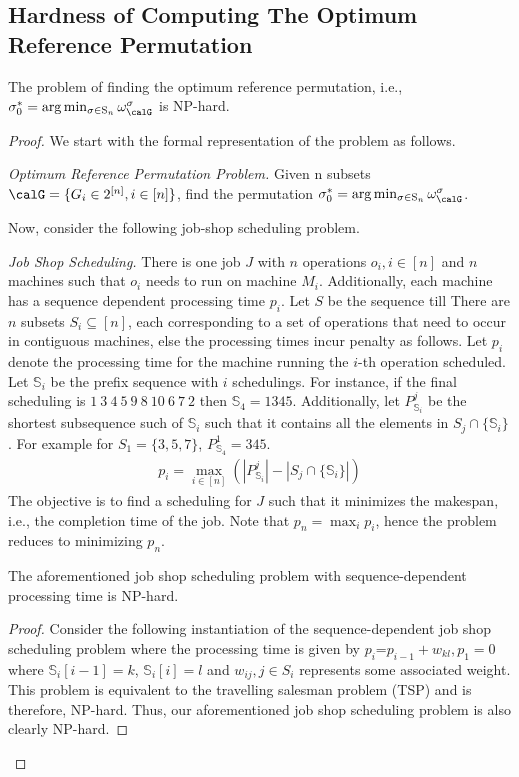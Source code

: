 \subsection{Hardness of Computing The Optimum Reference Permutation}\label{app:NP}
\begin{thm} The problem of finding the optimum reference permutation, i.e., $\sigma^*_0=\arg\min_{\sigma\in \mathrm{S}_n}\omega_{\calG}^{\sigma}$ is NP-hard. \label{thm:NP} \end{thm}
\begin{proof} We start with the formal
representation of the problem as follows.

\textit{Optimum Reference Permutation Problem.} Given n subsets $\calG=\{G_i\in 2^{[n]}, i \in [n]\}$,  find the permutation $\sigma^*_0=\arg\min_{\sigma\in \mathrm{S}_n}\omega_{\calG}^{\sigma}$.  

Now, consider the following job-shop scheduling problem.

\textit{Job Shop Scheduling.} There is one job $J$ with $n$ operations $o_i, i \in [n]$ and $n$ machines such that $o_i$ needs to run on machine $M_i$.  Additionally, each machine has a sequence dependent processing time $p_i$. Let $S$ be the sequence till 
There are $n$ subsets $S_i \subseteq [n]$, each corresponding to a set of operations that need to occur in contiguous machines, else the processing times incur penalty as follows. Let $p_i$ denote the processing time for the machine running the $i$-th operation scheduled. Let $\mathbb{S}_i$ be the prefix sequence  with $i$ schedulings. For instance, if the final scheduling is $ 1\:3\:4\:5\:9\:8\:10\:6\:7\:2$ then $\mathbb{S}_4=1345$. Additionally, let $P^j_{\mathbb{S}_i}$ be the shortest subsequence such of $\mathbb{S}_i$ such that it contains all the elements in $S_j \cap \{\mathbb{S}_{i}\}$. For example for $S_1=\{3,5,7\}$, $P^1_{\mathbb{S}_{4}}=345$. 
\begin{gather}p_i=\max_{i\in [n]}(|P^j_{\mathbb{S}_i}|-|S_j \cap \{\mathbb{S}_i\}|)\end{gather}
 The objective is to find a scheduling for $J$ such that it minimizes the makespan, i.e., the completion time of the job. Note that $p_n=\max_i{p_i}$, hence the problem reduces to minimizing $p_n$.

\begin{lemma}The aforementioned  job shop scheduling problem with sequence-dependent processing time is NP-hard.\end{lemma}
\begin{proof} Consider the following instantiation of the sequence-dependent job shop scheduling problem where the processing time is given by $p_i$=$p_{i-1}+w_{kl}, p_1=0$ where $\mathbb{S}_i[i-1]=k$, $\mathbb{S}_i[i]=l$ and $w_{ij}, j\in S_i$  represents some associated weight.    This problem is equivalent to the travelling salesman problem (TSP) \cite{TSP} and is therefore, NP-hard. Thus, our aforementioned job shop scheduling problem is also clearly NP-hard. \end{proof}


\end{proof}
